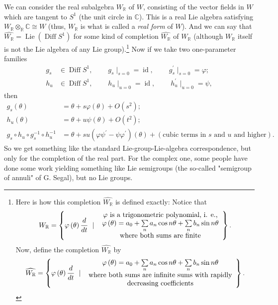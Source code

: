 \documentclass
[numbers=enddot,12pt,final,onecolumn,german,notitlepage]{scrartcl}%
\theoremstyle{definition}
\begin{document}
We can consider the real subalgebra $W_{\mathbb{R}}$ of $W$, consisting of the
vector fields in $W$ which are tangent to $S^{1}$ (the unit circle in
$\mathbb{C}$). This is a real Lie algebra satisfying $W_{\mathbb{R}}%
\otimes_{\mathbb{R}}\mathbb{C}\cong W$ (thus, $W_{\mathbb{R}}$ is what is
called a \textit{real form} of $W$). And we can say that
$\widehat{W_{\mathbb{R}}}=\operatorname*{Lie}\left(  \operatorname*{Diff}%
S^{1}\right)  $ for some kind of completion $\widehat{W_{\mathbb{R}}}$ of
$W_{\mathbb{R}}$ (although $W_{\mathbb{R}}$ itself is not the Lie algebra of
any Lie group).\footnote{Here is how this completion $\widehat{W_{\mathbb{R}}%
}$ is defined exactly: Notice that%
\[
W_{\mathbb{R}}=\left\{  \varphi\left(  \theta\right)  \dfrac{d}{dt}\ \mid\
\begin{array}
[c]{c}%
\varphi\text{ is a trigonometric polynomial, i. e.,}\\
\varphi\left(  \theta\right)  =a_{0}+\sum\limits_{n}a_{n}\cos n\theta
+\sum\limits_{n}b_{n}\sin n\theta\\
\text{where both sums are finite}%
\end{array}
\right\}  .
\]
Now, define the completion $\widehat{W_{\mathbb{R}}}$ by%
\[
\widehat{W_{\mathbb{R}}}=\left\{  \varphi\left(  \theta\right)  \dfrac{d}%
{dt}\ \mid\
\begin{array}
[c]{c}%
\varphi\left(  \theta\right)  =a_{0}+\sum\limits_{n}a_{n}\cos n\theta
+\sum\limits_{n}b_{n}\sin n\theta\\
\text{where both sums are infinite sums with rapidly}\\
\text{decreasing coefficients}%
\end{array}
\right\}  .
\]
} Now if we take two one-parameter families%
\begin{align*}
g_{s}  &  \in\operatorname*{Diff}S^{1},\ \ \ \ \ \ \ \ \ \ g_{s}\mid
_{s=0}=\operatorname*{id},\ \ \ \ \ \ \ \ \ \ g_{s}^{\prime}\mid_{s=0}%
=\varphi;\\
h_{u}  &  \in\operatorname*{Diff}S^{1},\ \ \ \ \ \ \ \ \ \ h_{u}\mid
_{u=0}=\operatorname*{id},\ \ \ \ \ \ \ \ \ \ h_{u}^{\prime}\mid_{u=0}=\psi,
\end{align*}
then%
\begin{align*}
g_{s}\left(  \theta\right)   &  =\theta+s\varphi\left(  \theta\right)
+O\left(  s^{2}\right)  ;\\
h_{u}\left(  \theta\right)   &  =\theta+u\psi\left(  \theta\right)  +O\left(
t^{2}\right)  ;\\
g_{s}\circ h_{u}\circ g_{s}^{-1}\circ h_{u}^{-1}  &  =\theta+su\left(
\varphi\psi^{\prime}-\psi\varphi^{\prime}\right)  \left(  \theta\right)
+\left(  \text{cubic terms in }s\text{ and }u\text{ and higher}\right)  .
\end{align*}
So we get something like the standard Lie-group-Lie-algebra correspondence,
but only for the completion of the real part. For the complex one, some people
have done some work yielding something like Lie semigroups (the so-called
"semigroup of annuli" of G. Segal), but no Lie groups.
\end{document}
